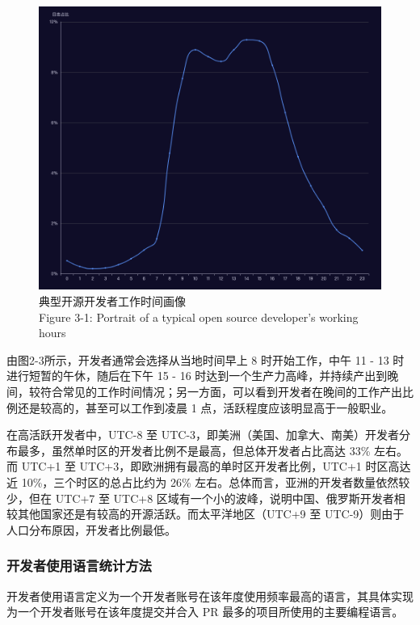 \begin{figure}[H]
    \centering
    \includegraphics[width=130mm]{./figures/image2-3.png}
    \caption{ 典型开源开发者工作时间画像\\Figure 3-1: Portrait of a typical open source developer's working hours}
\end{figure}

\par 由图2-3所示，开发者通常会选择从当地时间早上 8 时开始工作，中午 11 - 13 时进行短暂的午休，随后在下午 15 - 16 时达到一个生产力高峰，并持续产出到晚间，较符合常见的工作时间情况；另一方面，可以看到开发者在晚间的工作产出比例还是较高的，甚至可以工作到凌晨 1 点，活跃程度应该明显高于一般职业。

\par 在高活跃开发者中，UTC-8 至 UTC-3，即美洲（美国、加拿大、南美）开发者分布最多，虽然单时区的开发者比例不是最高，但总体开发者占比高达 33\% 左右。而 UTC+1 至 UTC+3，即欧洲拥有最高的单时区开发者比例，UTC+1 时区高达近 10\%，三个时区的总占比约为 26\% 左右。总体而言，亚洲的开发者数量依然较少，但在 UTC+7 至 UTC+8 区域有一个小的波峰，说明中国、俄罗斯开发者相较其他国家还是有较高的开源活跃。而太平洋地区（UTC+9 至 UTC-9）则由于人口分布原因，开发者比例最低。


\subsubsection{开发者使用语言统计方法}
\par 开发者使用语言定义为一个开发者账号在该年度使用频率最高的语言，其具体实现为一个开发者账号在该年度提交并合入 PR 最多的项目所使用的主要编程语言。


